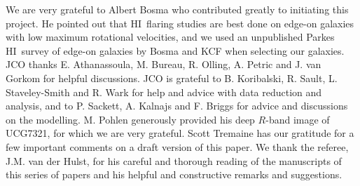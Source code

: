 \documentclass[traditabstract]{aa} %
\newcommand\HI{H{\small I}}
\begin{document}




\begin{acknowledgements}

We are very grateful to Albert Bosma who contributed greatly to
initiating this project. He pointed out that \HI\ flaring studies are
best done on edge-on galaxies with low maximum rotational velocities,
and we used an unpublished Parkes \HI\ survey of edge-on galaxies by
Bosma and KCF when selecting our galaxies.  JCO thanks E. Athanassoula,
M.  Bureau, R.  Olling, A. Petric and J. van Gorkom for helpful
discussions.  JCO is grateful to B. Koribalski, R. Sault, L.
Staveley-Smith and R.  Wark for help and advice with data reduction and
analysis, and to P. Sackett, A. Kalnajs and F. Briggs for advice and
discussions on the modelling.  M. Pohlen generously provided his deep
$R$-band image of UCG7321, for which we are very grateful. Scott Tremaine 
has our gratitude for a few important comments on a draft version of this paper.
We thank the referee, J.M. van der Hulst, for
his careful and  thorough reading of the manuscripts of this series of papers and
his helpful and constructive remarks and suggestions.



\end{acknowledgements}
\end{document}
